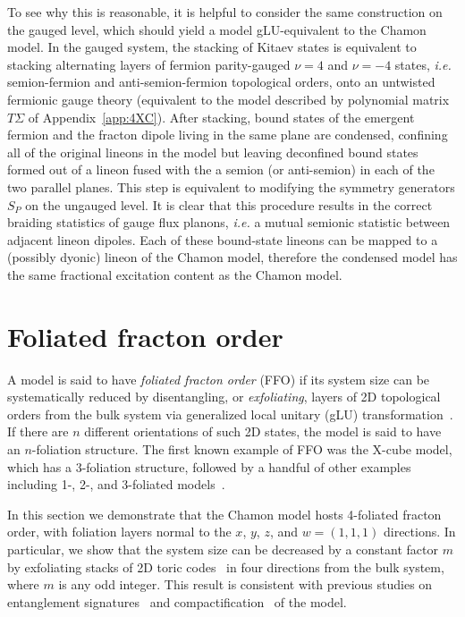 \documentclass[prx,twocolumn,superscriptaddress,nofootinbib,showpacs,notitlepage]{revtex4-2}
\newcommand{\Chamon}{Chamon }
\begin{document}
To see why this is reasonable, it is helpful to consider the same construction on the gauged level, which should yield a model gLU-equivalent to the Chamon model. In the gauged system, the stacking of Kitaev states is equivalent to stacking alternating layers of fermion parity-gauged $\nu=4$ and $\nu=-4$ states, \textit{i.e.} semion-fermion and anti-semion-fermion topological orders, onto an untwisted fermionic gauge theory (equivalent to the model described by polynomial matrix $T\Sigma$ of Appendix~\ref{app:4XC}). After stacking, bound states of the emergent fermion and the fracton dipole living in the same plane are condensed, confining all of the original lineons in the model but leaving deconfined bound states formed out of a lineon fused with the a semion (or anti-semion) in each of the two parallel planes. This step is equivalent to modifying the symmetry generators $S_P$ on the ungauged level. It is clear that this procedure results in the correct braiding statistics of gauge flux planons, \textit{i.e.} a mutual semionic statistic between adjacent lineon dipoles. Each of these bound-state lineons can be mapped to a (possibly dyonic) lineon of the Chamon model, therefore the condensed model has the same fractional excitation content as the Chamon model.

\section{Foliated fracton order}
\label{sec:FFO}

A model is said to have \textit{foliated fracton order} (FFO) if its system size can be systematically reduced by disentangling, or \textit{exfoliating}, layers of 2D topological orders from the bulk system via generalized local unitary (gLU) transformation~\cite{shirley2017fracton}. If there are $n$ different orientations of such 2D states, the model is said to have an $n$-foliation structure. The first known example of FFO was the X-cube model, which has a 3-foliation structure, followed by a handful of other examples including 1-, 2-, and 3-foliated models~\cite{shirley2018CB,Wang2019,shirley2018Fractional,Shirley2019}.

In this section we demonstrate that the \Chamon model hosts 4-foliated fracton order, with foliation layers normal to the $x$, $y$, $z$, and $w=(1,1,1)$ directions. In particular, we show that the system size can be decreased by a constant factor $m$ by exfoliating stacks of 2D toric codes~\cite{qdouble} in four directions from the bulk system, where $m$ is any odd integer. This result is consistent with previous studies on entanglement signatures~\cite{Dua_Classification_2019} and compactification~\cite{Dua2019_compactify} of the model.
\end{document}

